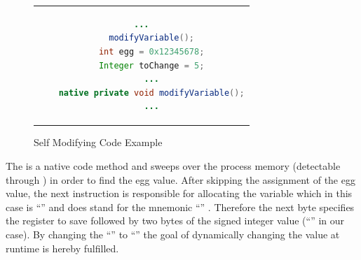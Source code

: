 \begin{figure}[htb]
  \centering
  \begin{tabular}{c}
  \begin{lstlisting}[language=Java]
    ...
    modifyVariable();
    int egg = 0x12345678;
    Integer toChange = 5;
    ...
    native private void modifyVariable();
    ...
  \end{lstlisting}
  \end{tabular}
  \caption[Self Modifying Code]{Self Modifying Code Example}
  \label{fig:self_modifying_code}
\end{figure}

The  is a native code method and sweeps
over the process memory (detectable through )
in order to find the egg value. After skipping the assignment of
the egg value, the next instruction is responsible for allocating
the  variable which in this case is ``''
and does stand for the mnemonic ``''
\parencite{bytecode_format}. Therefore the next byte specifies the
register to save followed by two bytes of the signed integer value
(``'' in our case). By changing the ``'' to
``'' the goal of dynamically changing the value at runtime
is hereby fulfilled.
